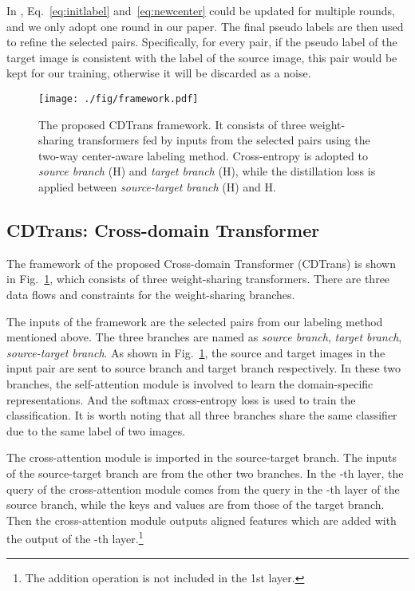 \documentclass[dvipsnames, svgnames, x11names, table]{article} \usepackage{iclr2022_conference,times}
\begin{document}
\begin{spacing}{1.0}
In \citet{liang2020we}, Eq.~\ref{eq:initlabel} and~\ref{eq:newcenter} could be updated for multiple rounds, and we only adopt one round in our paper. The final pseudo labels are then used to refine the selected pairs. Specifically, for every pair, if the pseudo label of the target image is consistent with the label of the source image, this pair would be kept for our training, otherwise it will be discarded as a noise.

\begin{figure}[!t]
\centering
\texttt{[image: ./fig/framework.pdf]}
\caption{The proposed CDTrans framework. It consists of three weight-sharing transformers fed by inputs from the selected pairs using the two-way center-aware labeling method. Cross-entropy is adopted to \textit{source branch} (H) and \textit{target branch} (H), while the distillation loss is applied between \textit{source-target branch} (H) and H. }
\vspace{-3mm}
\label{fig:framework}
\end{figure}

\subsection{CDTrans: Cross-domain Transformer}
\label{ssec:cdtrans}
The framework of the proposed Cross-domain Transformer (CDTrans) is shown in Fig.~\ref{fig:framework}, which consists of three weight-sharing transformers. There are three data flows and constraints for the weight-sharing branches.

The inputs of the framework are the selected pairs from our labeling method mentioned above. The three branches are named as \textit{source branch}, \textit{target branch}, \textit{source-target branch}. As shown in Fig.~\ref{fig:framework}, the source and target images in the input pair are sent to source branch and target branch respectively. In these two branches, the self-attention module is involved to learn the domain-specific representations. And the softmax cross-entropy loss is used to train the classification. It is worth noting that all three branches share the same classifier due to the same label of two images.

The cross-attention module is imported in the source-target branch. The inputs of the source-target branch are from the other two branches. In the -th layer, the query of the cross-attention module comes from the query in the -th layer of the source branch, while the keys and values are from those of the target branch. Then the cross-attention module outputs aligned features which are added with the output of the -th layer.\footnote{The addition operation is not included in the 1st layer.}


\end{spacing}
\end{document}
